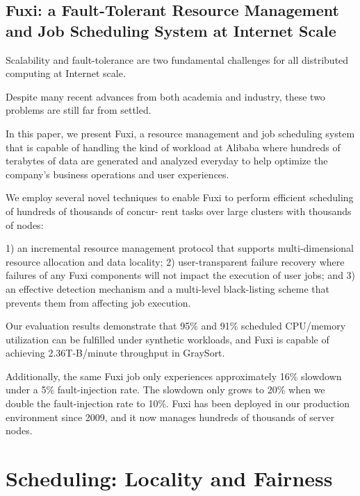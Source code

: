 \documentclass[a4paper,11pt]{article}
\begin{document}
\subsection*{Fuxi: a Fault-Tolerant Resource Management and Job Scheduling System at Internet Scale}
{\color{cyan} {\color{magenta}}

Scalability and fault-tolerance 
are two fundamental challenges for all 
distributed computing at Internet scale. 

Despite many recent advances from both academia and industry, 
these two problems are still far from settled. 

In this paper, we present 
{\color{black} Fuxi\cite{fuxi}}, 
a resource management and job scheduling system that is capable of handling the kind of workload 
at Alibaba where hundreds of terabytes of data are generated and analyzed everyday 
to help optimize the company's business operations and user experiences. 

We employ several novel techniques to enable Fuxi to perform efficient scheduling of hundreds of thousands of concur-
rent tasks over large clusters with thousands of nodes: 

1) an incremental resource management protocol that 
supports multi-dimensional resource allocation and data locality; 
2) user-transparent failure recovery where 
failures of any Fuxi components will not impact the execution of user jobs; and
3) an effective detection mechanism and a multi-level black-listing scheme that 
prevents them from affecting job execution. 

Our evaluation results demonstrate that 95\% and 91\% scheduled CPU/memory utilization can be fulfilled under
synthetic workloads, and Fuxi is capable of achieving 2.36T-B/minute throughput in GraySort. 

Additionally,  the same Fuxi job only experiences approximately 16\% slowdown under a 5\% fault-injection rate. 
The slowdown only grows to 20\% when we double the fault-injection rate to 10\%. 
Fuxi has been deployed in our production environment since 2009, and 
it now manages hundreds of thousands of server nodes.

}


\section{Scheduling: Locality and Fairness}
\end{document}
